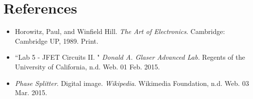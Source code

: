 \documentclass[authoryear, 12pt,5p, times]{elsarticle}
\begin{document}
  \section*{References}
 \begin{footnotesize}
 \begin{itemize}
 \item Horowitz, Paul, and Winfield Hill. \textit{The Art of Electronics}. Cambridge: Cambridge UP, 1989. Print.
 \item ``Lab 5 - JFET Circuits II. " \textit{Donald A. Glaser Advanced Lab.} Regents of the University of California, n.d. Web. 01 Feb. 2015.
 \item \textit{Phase Splitter}. Digital image. \textit{Wikipedia}. Wikimedia Foundation, n.d. Web. 03 Mar. 2015.
 \end{itemize} 
  \end{footnotesize}
\end{document}
